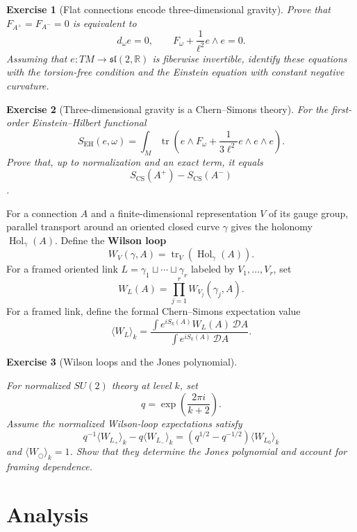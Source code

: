 \documentclass{article}
\newtheorem{exercise}{Exercise}
\begin{document}
\begin{exercise}[Flat connections encode three-dimensional gravity]\leavevmode\par
\textit{Prove that $F_{A^+}=F_{A^-}=0$ is equivalent to}
\[
d_\omega e=0,
\qquad
F_\omega+\frac1{\ell^2}e\wedge e=0.
\]
\textit{Assuming that $e:TM\to\mathfrak{sl}(2,\mathbb R)$ is fiberwise invertible, identify these equations with the torsion-free condition and the Einstein equation with constant negative curvature.}
\end{exercise}

\begin{exercise}[Three-dimensional gravity is a Chern--Simons theory]\leavevmode\par
\textit{For the first-order Einstein--Hilbert functional}
\[
S_{\mathrm{EH}}(e,\omega)
=\int_M\operatorname{tr}\left(
e\wedge F_\omega+\frac{1}{3\ell^2}e\wedge e\wedge e
\right).
\]
\textit{Prove that, up to normalization and an exact term, it equals}
\[
S_{\mathrm{CS}}(A^+)-S_{\mathrm{CS}}(A^-)
\]
\cite{achucarro-townsend,witten-gravity}.
\end{exercise}

For a connection $A$ and a finite-dimensional representation $V$ of its gauge group, parallel transport around an oriented closed curve $\gamma$ gives the holonomy $\operatorname{Hol}_\gamma(A)$. Define the \textbf{Wilson loop}
\[
W_V(\gamma,A)
=\operatorname{tr}_V\!\left(\operatorname{Hol}_\gamma(A)\right).
\]
For a framed oriented link $L=\gamma_1\sqcup\cdots\sqcup\gamma_r$ labeled by $V_1,\ldots,V_r$, set
\[
W_L(A)=\prod_{j=1}^rW_{V_j}(\gamma_j,A).
\]
For a framed link, define the formal Chern--Simons expectation value \cite{witten-jones}
\[
\langle W_L\rangle_k
=
\frac{\int e^{iS_k(A)}W_L(A)\,\mathcal DA}
{\int e^{iS_k(A)}\,\mathcal DA}.
\]
\begin{exercise}[Wilson loops and the Jones polynomial]
\label{ex:wilson-jones}\leavevmode\par
\textit{For normalized $SU(2)$ theory at level $k$, set}
\[
q=\exp\left(\frac{2\pi i}{k+2}\right).
\]
\textit{Assume the normalized Wilson-loop expectations satisfy}
\[
q^{-1}\langle W_{L_+}\rangle_k
-q\langle W_{L_-}\rangle_k
=\left(q^{1/2}-q^{-1/2}\right)\langle W_{L_0}\rangle_k
\]
\textit{and $\langle W_{\bigcirc}\rangle_k=1$. Show that they determine the
Jones polynomial and account for framing dependence.}
\end{exercise}

\section{Analysis}
\end{document}
